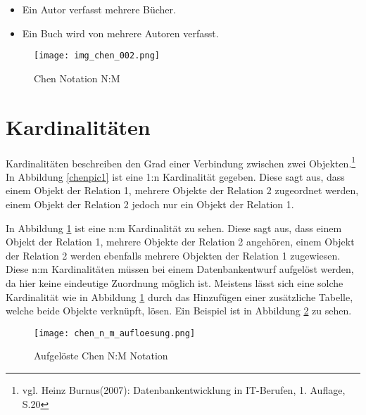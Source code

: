 \begin{itemize}
\item Ein Autor verfasst mehrere Bücher.
\item Ein Buch wird von mehrere Autoren verfasst.
\end{itemize}

\begin{figure}[H]
\begin{center}
\texttt{[image: img\_chen\_002.png]}
\caption{Chen Notation N:M}
\label{chenpic2}
\end{center}
\end{figure}

\section{Kardinalitäten}

Kardinalitäten beschreiben den Grad einer Verbindung zwischen zwei Objekten.\footnote{vgl. Heinz Burnus(2007): Datenbankentwicklung in IT-Berufen, 1. Auflage, S.20}
In Abbildung \ref{chenpic1} ist eine 1:n Kardinalität gegeben.
Diese sagt aus, dass einem Objekt der Relation 1, mehrere Objekte der Relation 2 zugeordnet werden, einem Objekt der Relation 2 jedoch nur ein Objekt der Relation 1.

In Abbildung \ref{chenpic2} ist eine n:m Kardinalität zu sehen.
Diese sagt aus, dass einem Objekt der Relation 1, mehrere Objekte der Relation 2 angehören, einem Objekt der Relation 2 werden ebenfalls mehrere Objekten der Relation 1 zugewiesen.
Diese n:m Kardinalitäten müssen bei einem Datenbankentwurf aufgelöst werden, da hier keine eindeutige Zuordnung möglich ist. Meistens lässt sich eine solche Kardinalität wie in Abbildung \ref{chenpic2} durch das Hinzufügen einer zusätzliche Tabelle, welche beide Objekte verknüpft, lösen.
Ein Beispiel ist in Abbildung \ref{chenpic3} zu sehen.

\begin{figure}[H]
\begin{center}
\texttt{[image: chen\_n\_m\_aufloesung.png]}
\caption{Aufgelöste Chen N:M Notation}
\label{chenpic3}
\end{center}
\end{figure}

